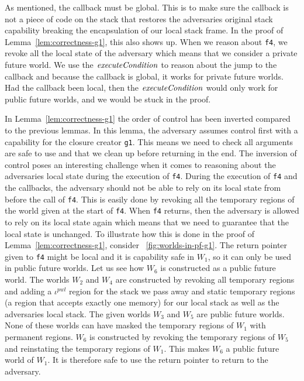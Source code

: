 \documentclass[compsoc,conference,letterpaper,fleqn]{IEEEtran}
\newcommand{\var}[1]{\mathit{#1}}
\newcommand{\pwl}{\var{pwl}}
\newcommand{\plainfun}[2]{
  \ifthenelse{\equal{#2}{}}
  {\mathit{#1}}
  {\mathit{#1}(#2)}
}
\newcommand{\execCond}[1]{\plainfun{executeCondition}{#1}}
\begin{document}
As mentioned, the callback must be global. This is to make sure the
callback is not a piece of code on the stack that restores the
adversaries original stack capability breaking the encapsulation of
our local stack frame. In the proof of Lemma~\ref{lem:correctness-g1},
this also shows up. When we reason about \texttt{f4}, we revoke all
the local state of the adversary which means that we consider a
private future world. We use the $\execCond{}$ to reason about the
jump to the callback and because the callback is global, it works for
private future worlds. Had the callback been local, then the
$\execCond{}$ would only work for public future worlds, and we would
be stuck in the proof.

In Lemma~\ref{lem:correctness-g1} the order of control has been
inverted compared to the previous lemmas. In this lemma, the adversary
assumes control first with a capability for the closure creator
\texttt{g1}. This means we need to check all arguments are safe
to use and that we clean up before returning in the end. The inversion
of control poses an interesting challenge when it comes to reasoning
about the adversaries local state during the execution of
\texttt{f4}. During the execution of \texttt{f4} and the callbacks, the
adversary should not be able to rely on its local state from before
the call of \texttt{f4}. This is easily done by revoking all the
temporary regions of the world given at the start of \texttt{f4}. When
\texttt{f4} returns, then the adversary is allowed to rely on its
local state again which means that we need to guarantee that the local
state is unchanged. To illustrate how this is done in the proof of
Lemma~\ref{lem:correctness-g1}, consider
\figurename~\ref{fig:worlds-in-pf-g1}. The return pointer given to
\texttt{f4} might be local and it is capability safe in $W_1$, so it
can only be used in public future worlds. Let us see how $W_6$ is
constructed as a public future world. The worlds $W_2$ and $W_4$ are constructed by revoking all
temporary regions and adding a $\iota^\pwl$ region for the stack we
pass away and static temporary regions (a region that accepts exactly
one memory) for our local stack as well as the adversaries local stack.
The given worlds $W_3$ and $W_5$ are public future worlds. None of
these worlds can have masked the temporary regions of $W_1$ with permanent
regions. $W_6$ is constructed by revoking the temporary regions of
$W_5$ and reinstating the temporary regions of $W_1$. This makes $W_6$
a public future world of $W_1$. It is therefore safe to use the return
pointer to return to the adversary.
\end{document}
